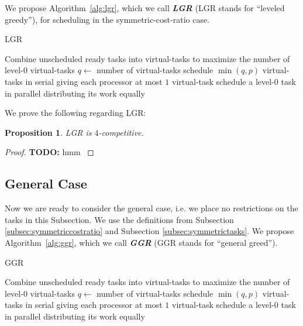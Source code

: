 \documentclass[twocolumn]{article}[10pt]
\newcommand{\defn}[1]{{\textit{\textbf{\boldmath #1}}}\xspace}
\newcommand{\todo}[1]{{\color{red}\textbf{TODO:} #1}}
\newtheorem{proposition}{Proposition}
\begin{document}
We propose Algorithm~\ref{alg:lgr}, which we call \defn{LGR}
(LGR stands for \enquote{leveled greedy}),
for scheduling in the symmetric-cost-ratio case.

\begin{algorithm}
  \caption{LGR}
  \label{alg:lgr}
  \begin{algorithmic}
        \State Combine unscheduled ready tasks into virtual-tasks
        to maximize the number of level-$0$ virtual-tasks
        \State $q \gets $ number of virtual-tasks 
          \State schedule $\min(q, p)$ virtual-tasks in serial
          \State giving each processor at most $1$ virtual-task
        \Else
          \State schedule a level-$0$ task in parallel
          \State distributing its work equally 
        \EndIf
      \EndIf
    \EndWhile
  \end{algorithmic}
\end{algorithm}

We prove the following regarding LGR:

\begin{proposition}
  LGR is $4$-competitive.
\end{proposition}
\begin{proof}
  \todo{
  hmm
}
\end{proof}

\subsection{General Case}
Now we are ready to consider the general case, i.e. we place no
restrictions on the tasks in this Subsection.
We use the definitions from Subsection
\ref{subsec:symmetriccostratio} and Subsection
\ref{subsec:symmetrictasks}.
We propose Algorithm~\ref{alg:ggr}, which we call
\defn{GGR} (GGR stands for \enquote{general greed}).

\begin{algorithm}
  \caption{GGR}
  \label{alg:ggr}
  \begin{algorithmic}
        \State Combine unscheduled ready tasks into virtual-tasks
        to maximize the number of level-$0$ virtual-tasks
        \State $q \gets $ number of virtual-tasks 
          \State schedule $\min(q, p)$ virtual-tasks in serial
          \State giving each processor at most $1$ virtual-task
        \Else
          \State schedule a level-$0$ task in parallel
          \State distributing its work equally 
        \EndIf
      \EndIf
    \EndWhile
  \end{algorithmic}
\end{algorithm}
\end{document}
